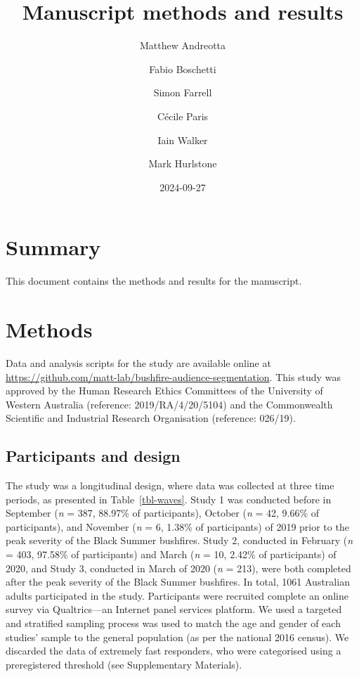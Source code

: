 \documentclass[
  letterpaper,
  DIV=11,
  numbers=noendperiod]{scrartcl}
\title{Manuscript methods and results}
\author{Matthew Andreotta \and Fabio Boschetti \and Simon
Farrell \and Cécile Paris \and Iain Walker \and Mark Hurlstone}
\date{2024-09-27}
\begin{document}
\maketitle
\ifdefined\Shaded\renewenvironment{Shaded}{\begin{tcolorbox}[interior hidden, breakable, borderline west={3pt}{0pt}{shadecolor}, boxrule=0pt, frame hidden, enhanced, sharp corners]}{\end{tcolorbox}}\fi

\hypertarget{summary}{%
\section{Summary}\label{summary}}

This document contains the methods and results for the manuscript.

\hypertarget{methods}{%
\section{Methods}\label{methods}}

Data and analysis scripts for the study are available online at
\url{https://github.com/matt-lab/bushfire-audience-segmentation}. This
study was approved by the Human Research Ethics Committees of the
University of Western Australia (reference: 2019/RA/4/20/5104) and the
Commonwealth Scientific and Industrial Research Organisation (reference:
026/19).

\hypertarget{participants-and-design}{%
\subsection{Participants and design}\label{participants-and-design}}

The study was a longitudinal design, where data was collected at three
time periods, as presented in Table~\ref{tbl-waves}. Study 1 was
conducted before in September (\textit{n} = 387, 88.97\% of
participants), October (\textit{n} = 42, 9.66\% of participants), and
November (\textit{n} = 6, 1.38\% of participants) of 2019 prior to the
peak severity of the Black Summer bushfires. Study 2, conducted in
February (\textit{n} = 403, 97.58\% of participants) and March
(\textit{n} = 10, 2.42\% of participants) of 2020, and Study 3,
conducted in March of 2020 (\textit{n} = 213), were both completed after
the peak severity of the Black Summer bushfires. In total, 1061
Australian adults participated in the study. Participants were recruited
complete an online survey via Qualtrics---an Internet panel services
platform. We used a targeted and stratified sampling process was used to
match the age and gender of each studies' sample to the general
population (as per the national 2016 census). We discarded the data of
extremely fast responders, who were categorised using a preregistered
threshold (see Supplementary Materials).
\end{document}
